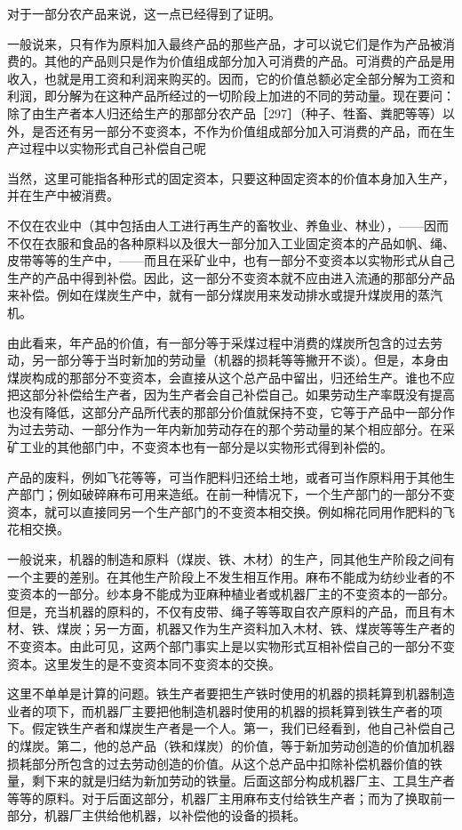 对于一部分农产品来说，这一点已经得到了证明。

一般说来，只有作为原料加入最终产品的那些产品，才可以说它们是作为产品被消费的。其他的产品则只是作为价值组成部分加入可消费的产品。可消费的产品是用收入，也就是用工资和利润来购买的。因而，它的价值总额必定全部分解为工资和利润，即分解为在这种产品所经过的一切阶段上加进的不同的劳动量。现在要问：除了由生产者本人归还给生产的那部分农产品［297］（种子、牲畜、粪肥等等）以外，是否还有另一部分不变资本，不作为价值组成部分加入可消费的产品，而在生产过程中以实物形式自己补偿自己呢

当然，这里可能指各种形式的固定资本，只要这种固定资本的价值本身加入生产，并在生产中被消费。

不仅在农业中（其中包括由人工进行再生产的畜牧业、养鱼业、林业），——因而不仅在衣服和食品的各种原料以及很大一部分加入工业固定资本的产品如帆、绳、皮带等等的生产中，——而且在采矿业中，也有一部分不变资本以实物形式从自己生产的产品中得到补偿。因此，这一部分不变资本就不应由进入流通的那部分产品来补偿。例如在煤炭生产中，就有一部分煤炭用来发动排水或提升煤炭用的蒸汽机。

由此看来，年产品的价值，有一部分等于采煤过程中消费的煤炭所包含的过去劳动，另一部分等于当时新加的劳动量（机器的损耗等等撇开不谈）。但是，本身由煤炭构成的那部分不变资本，会直接从这个总产品中留出，归还给生产。谁也不应把这部分补偿给生产者，因为生产者会自己补偿自己。如果劳动生产率既没有提高也没有降低，这部分产品所代表的那部分价值就保持不变，它等于产品中一部分作为过去劳动、一部分作为一年内新加劳动存在的那个劳动量的某个相应部分。在采矿工业的其他部门中，不变资本也有一部分是以实物形式得到补偿的。

产品的废料，例如飞花等等，可当作肥料归还给土地，或者可当作原料用于其他生产部门；例如破碎麻布可用来造纸。在前一种情况下，一个生产部门的一部分不变资本，就可以直接同另一个生产部门的不变资本相交换。例如棉花同用作肥料的飞花相交换。

一般说来，机器的制造和原料（煤炭、铁、木材）的生产，同其他生产阶段之间有一个主要的差别。在其他生产阶段上不发生相互作用。麻布不能成为纺纱业者的不变资本的一部分。纱本身不能成为亚麻种植业者或机器厂主的不变资本的一部分。但是，充当机器的原料的，不仅有皮带、绳子等等取自农产原料的产品，而且有木材、铁、煤炭；另一方面，机器又作为生产资料加入木材、铁、煤炭等等生产者的不变资本。由此可见，这两个部门事实上是以实物形式互相补偿自己的一部分不变资本。这里发生的是不变资本同不变资本的交换。

这里不单单是计算的问题。铁生产者要把生产铁时使用的机器的损耗算到机器制造业者的项下，而机器厂主要把他制造机器时使用的机器的损耗算到铁生产者的项下。假定铁生产者和煤炭生产者是一个人。第一，我们已经看到，他自己补偿自己的煤炭。第二，他的总产品（铁和煤炭）的价值，等于新加劳动创造的价值加机器损耗部分所包含的过去劳动创造的价值。从这个总产品中扣除补偿机器价值的铁量，剩下来的就是归结为新加劳动的铁量。后面这部分构成机器厂主、工具生产者等等的原料。对于后面这部分，机器厂主用麻布支付给铁生产者；而为了换取前一部分，机器厂主供给他机器，以补偿他的设备的损耗。

